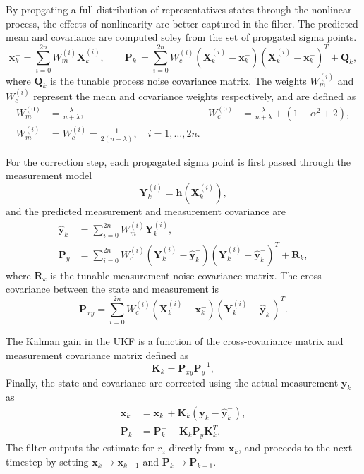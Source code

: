 By propgating a full distribution of representatives states through the nonlinear process, the effects of nonlinearity are better captured in the filter. The predicted mean and covariance are computed soley from the set of propgated sigma points. 
\begin{equation}
    \bm{x}_k^- = \sum_{i=0}^{2n} W_m^{(i)} \bm{X}_k^{(i)}, \qquad
    \bm{P}_k^- = \sum_{i=0}^{2n} W_c^{(i)}(\bm{X}_k^{(i)} - \bm{x}_k^-)(\bm{X}_k^{(i)} - \bm{x}_k^-)^T + \bm{Q}_k,
\end{equation}
where $\bm{Q}_k$ is the tunable process noise covariance matrix. The weights $W_m^{(i)}$ and $W_c^{(i)}$ represent the mean and covariance weights respectively, and are defined as
\begin{align}
    W_m^{(0)} &= \frac{\lambda}{n+\lambda}, &
    W_c^{(0)} &= \frac{\lambda}{n+\lambda} + (1-\alpha^2+2),\\
    W_m^{(i)} &= W_c^{(i)} = \frac{1}{2(n+\lambda)}, \quad i=1,\dots,2n.
\end{align}

For the correction step, each propagated sigma point is first passed through the measurement model 
\begin{equation}
    \bm{Y}_k^{(i)} = \bm{h}(\bm{X}_k^{(i)}),
\end{equation}
and the predicted measurement and measurement covariance are
\begin{align}
    \hat{\bm{y}}_k^- &= \sum_{i=0}^{2n} W_m^{(i)} \bm{Y}_k^{(i)},\\
    \bm{P}_y &= \sum_{i=0}^{2n} W_c^{(i)}(\bm{Y}_k^{(i)} - \hat{\bm{y}}_k^-)(\bm{Y}_k^{(i)} - \hat{\bm{y}}_k^-)^T + \bm{R}_k,
\end{align}
where $\bm{R}_k$ is the tunable measurement noise covariance matrix. The cross-covariance between the state and measurement is
\begin{equation}
    \bm{P}_{xy} = \sum_{i=0}^{2n} W_c^{(i)}(\bm{X}_k^{(i)} - \bm{x}_k^-)(\bm{Y}_k^{(i)} - \hat{\bm{y}}_k^-)^T.
\end{equation}

The Kalman gain in the UKF is a function of the cross-covariance matrix and measurement covariance matrix defined as 
\begin{equation}
    \bm{K}_k = \bm{P}_{xy}\bm{P}_y^{-1},
\end{equation}
Finally, the state and covariance are corrected using the actual measurement $\bm{y}_k$ as
\begin{align}
    \bm{x}_k &= \bm{x}_k^- + \bm{K}_k(\bm{y}_k - \hat{\bm{y}}_k^-),\\
    \bm{P}_k &= \bm{P}_k^- - \bm{K}_k\bm{P}_y\bm{K}_k^T.
\end{align}
The filter outputs the estimate for $r_z$ directly from $\bm{x}_k$, and proceeds to the next timestep by setting $\bm{x}_k\rightarrow\bm{x}_{k-1}$ and $\bm{P}_k\rightarrow\bm{P}_{k-1}$.



